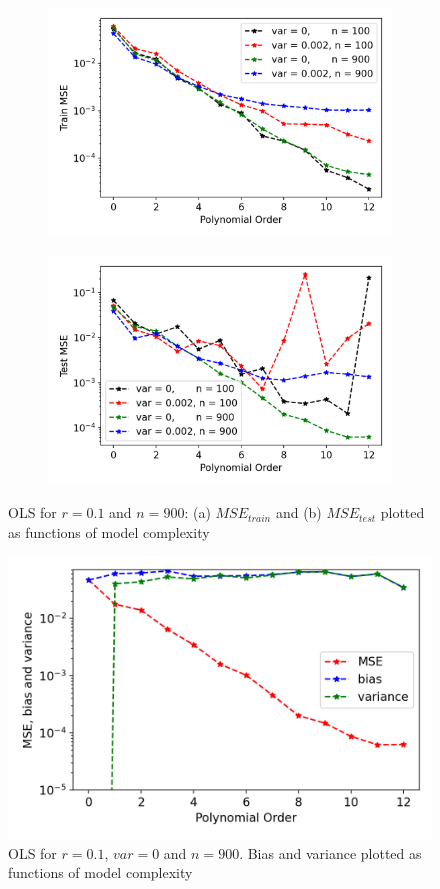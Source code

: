 \begin{figure}
\centering
\begin{subfigure}{.5\textwidth}
  \centering
  \includegraphics[width=.9\linewidth]{Images/ols5.png}
  \caption{}
  \label{fig:ols4}
\end{subfigure}%
\begin{subfigure}{.5\textwidth}
  \centering
  \includegraphics[width=.9\linewidth]{Images/ols4.png}
  \caption{}
  \label{fig:ols5}
\end{subfigure}
\caption{OLS for $r=0.1$ and $n=900$: (a) $MSE_{train}$ and (b) $MSE_{test}$ plotted as functions of model complexity}
\label{fig:OLS2}
\end{figure}

\begin{figure}
\centering
\includegraphics[width=.7\linewidth]{Images/ols7.png}
\caption{OLS for $r=0.1$, $var=0$ and $n=900$. Bias and variance plotted as functions of model complexity}
\label{fig:OLS3}
\end{figure}

